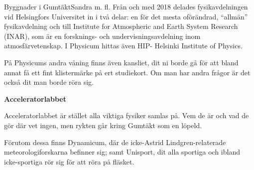 \documentclass{spektraklet}
\begin{document}
\begin{artikel}{Byggnader i Gumtäkt}{Sandra m. fl.}
Från och med 2018 delades fysikavdelningen vid Helsingfors Universitet in i två delar: en för det mesta oförändrad, “allmän” fysikavdelning och till Institute for Atmospheric and Earth System Research (INAR), som är en forsknings- och undervisningsavdelning inom atmosfärvetenskap. I Physicum hittas även HIP- Helsinki Institute of Physics.

På Physicums andra våning finns även kansliet, dit ni borde gå för att bland annat få ett fint klistermärke på ert studiekort. Om man har andra frågor är det också dit man borde röra sig. 


\textbf{Acceleratorlabbet}

Acceleratorlabbet är stället alla viktiga fysiker samlas på. Vem de är och vad de gör där vet ingen, men rykten går kring Gumtäkt som en löpeld.

Förutom dessa finns Dynamicum, där de icke-Astrid Lindgren-relaterade meteorologiforskarna befinner sig; samt Unisport, dit alla sportiga och ibland icke-sportiga rör sig för att röra på fläsket.

\end{artikel}
\end{document}
